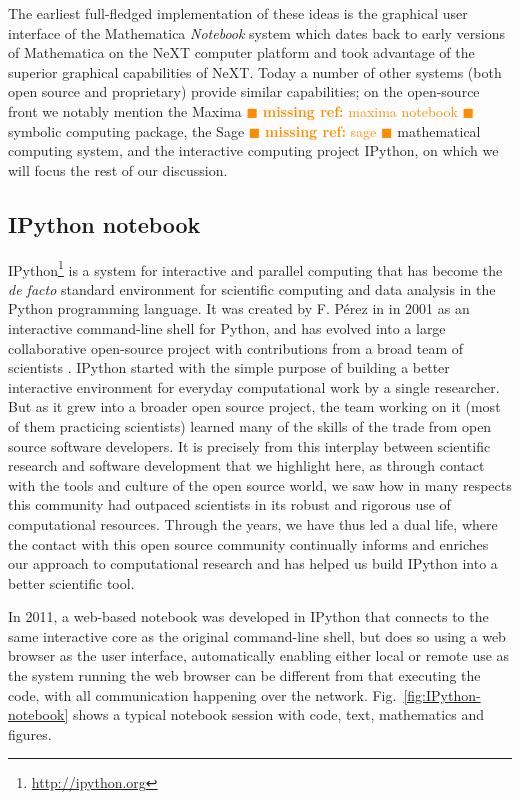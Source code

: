 \documentclass[ChapterTOCs,krantz2]{krantz} %
\theoremstyle{definition}
\newcommand{\mref}[1] { \textcolor{darkorange} {
\ensuremath{\blacksquare} {\bf missing ref:}  {#1}
\ensuremath{\blacksquare} } }
\begin{document}
The earliest full-fledged implementation of these ideas is the graphical user
interface of the Mathematica \emph{Notebook} system which dates back to early
versions of Mathematica on the NeXT computer platform and took advantage of the
superior graphical capabilities of NeXT.  Today a number of other systems (both
open source and proprietary) provide similar capabilities; on the open-source
front we notably mention the Maxima \mref{maxima notebook} symbolic computing
package, the Sage \mref{sage} mathematical computing system, and the
interactive computing project IPython, on which we will focus the rest of our
discussion.

\subsection{IPython notebook}\label{IPython}

IPython\footnote{\url{http://ipython.org}} is a system for interactive and
parallel computing that has become the \emph{de facto} standard environment for
scientific computing and data analysis in the Python programming language.  It
was created by F. Pérez in in 2001 as an interactive command-line shell for
Python, and has evolved into a large collaborative open-source project with
contributions from a broad team of scientists \cite{PER-GRA:2007}.  IPython
started with the simple purpose of building a better interactive environment
for everyday computational work by a single researcher.  But as it grew into a
broader open source project, the team working on it (most of them practicing
scientists) learned many of the skills of the trade from open source software
developers.  It is precisely from this interplay between scientific research
and software development that we highlight here, as through contact with the
tools and culture of the open source world, we saw how in many respects this
community had outpaced scientists in its robust and rigorous use of
computational resources.  Through the years, we have thus led a dual life,
where the contact with this open source community continually informs and
enriches our approach to computational research and has helped us build IPython
into a better scientific tool.

In 2011, a web-based notebook was developed in IPython that connects to the
same interactive core as the original command-line shell, but does so using a
web browser as the user interface, automatically enabling either local or
remote use as the system running the web browser can be different from that
executing the code, with all communication happening over the network.
Fig.~\ref{fig:IPython-notebook} shows a typical notebook session with code,
text, mathematics and figures.
\end{document}

